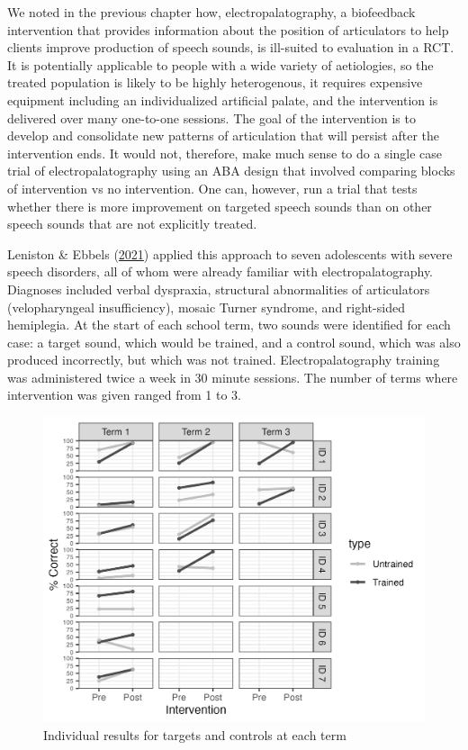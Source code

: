 \documentclass{krantz}
\begin{document}
We noted in the previous chapter how, electropalatography, a biofeedback intervention that provides information about the position of articulators to help clients improve production of speech sounds, is ill-suited to evaluation in a RCT. It is potentially applicable to people with a wide variety of aetiologies, so the treated population is likely to be highly heterogenous, it requires expensive equipment including an individualized artificial palate, and the intervention is delivered over many one-to-one sessions. The goal of the intervention is to develop and consolidate new patterns of articulation that will persist after the intervention ends. It would not, therefore, make much sense to do a single case trial of electropalatography using an ABA design that involved comparing blocks of intervention vs no intervention. One can, however, run a trial that tests whether there is more improvement on targeted speech sounds than on other speech sounds that are not explicitly treated.

Leniston \& Ebbels (\protect\hyperlink{ref-leniston2021}{2021}) applied this approach to seven adolescents with severe speech disorders, all of whom were already familiar with electropalatography. Diagnoses included verbal dyspraxia, structural abnormalities of articulators (velopharyngeal insufficiency), mosaic Turner syndrome, and right-sided hemiplegia. At the start of each school term, two sounds were identified for each case: a target sound, which would be trained, and a control sound, which was also produced incorrectly, but which was not trained. Electropalatography training was administered twice a week in 30 minute sessions. The number of terms where intervention was given ranged from 1 to 3.

\begin{figure}
\includegraphics[width=0.9\linewidth]{images_bw/Ebbels} \caption{Individual results for targets and controls at each term}\label{fig:ebbelsfig}
\end{figure}
\end{document}
